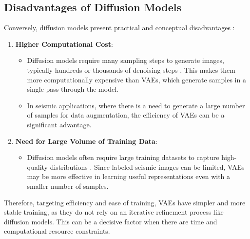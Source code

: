 \documentclass{ieeeaccess}
\begin{document}
\subsection*{Disadvantages of Diffusion Models}
Conversely, diffusion models present practical and conceptual disadvantages \cite{ref17}:
\begin{enumerate}
    \item \textbf{Higher Computational Cost}:
    \begin{itemize}
        \item Diffusion models require many sampling steps to generate images, typically hundreds or thousands of denoising steps \cite{ref17}. This makes them more computationally expensive than VAEs, which generate samples in a single pass through the model.
        \item In seismic applications, where there is a need to generate a large number of samples for data augmentation, the efficiency of VAEs can be a significant advantage. 
    \end{itemize}
    \item \textbf{Need for Large Volume of Training Data}:
    \begin{itemize}
        \item Diffusion models often require large training datasets to capture high-quality distributions  \cite{ref17}. Since labeled seismic images can be limited, VAEs may be more effective in learning useful representations even with a smaller number of samples.
    \end{itemize}
\end{enumerate}

Therefore, targeting efficiency and ease of training, VAEs have simpler and more stable training, as they do not rely on an iterative refinement process like diffusion models. This can be a decisive factor when there are time and computational resource constraints.

\end{document}
